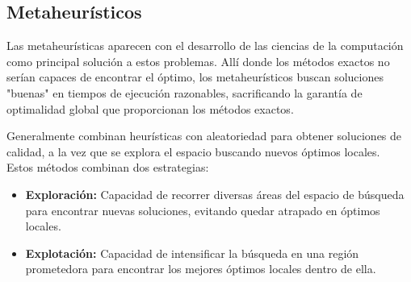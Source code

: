 \documentclass[12pt,a4paper]{book}
\begin{document}
\hrulefill

\subsection{Metaheurísticos}
Las metaheurísticas aparecen con el desarrollo de las ciencias de la computación como principal solución a estos problemas. Allí donde los métodos exactos no serían capaces de encontrar el óptimo,
los metaheurísticos buscan soluciones "buenas" en tiempos de ejecución razonables, sacrificando la garantía de optimalidad global que proporcionan los métodos exactos.

Generalmente combinan heurísticas con aleatoriedad para obtener soluciones de calidad, a la vez que se explora el espacio buscando nuevos óptimos locales.\\
Estos métodos combinan dos estrategias:
\begin{itemize}
    \item \textbf{Exploración:} Capacidad de recorrer diversas áreas del espacio de búsqueda para encontrar nuevas soluciones, evitando quedar atrapado en óptimos locales.
    \item \textbf{Explotación:} Capacidad de intensificar la búsqueda en una región prometedora para encontrar los mejores óptimos locales dentro de ella.
\end{itemize}
\end{document}
